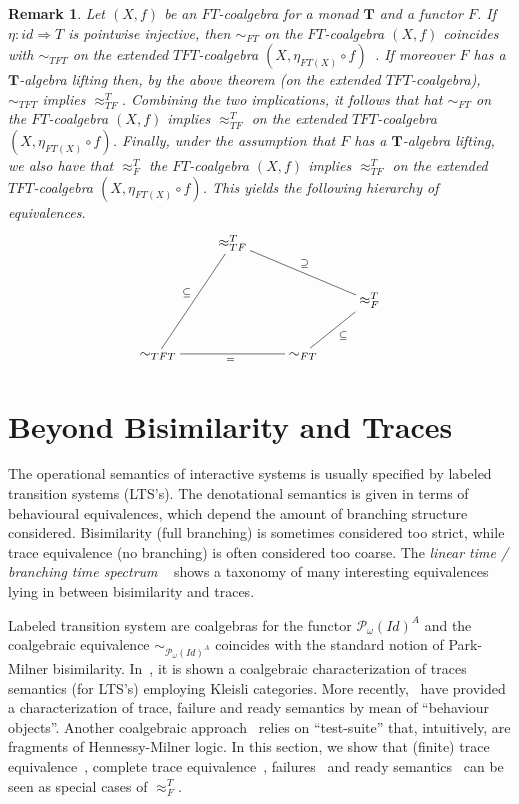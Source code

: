 \documentclass{LMCS}
\def\pow#1{{\mathcal P_\omega}#1}
\def\T{\mathbf{T}}
\newtheorem*{remark}{Remark}
\begin{document}
\begin{remark}
Let $(X,f)$ be an $FT$-coalgebra for a monad $\T$ and a functor $F$. If
$\eta\colon \mathit{id} \Rightarrow T$ is pointwise injective, then
$\sim_{FT}$ on the
$FT$-coalgebra $(X,f)$ coincides with $\sim_{TFT}$ on the extended
$TFT$-coalgebra
$(X, \eta_{FT(X)} \circ f)$~\cite{Rutten00,bartels}. If moreover $F$ has a
$\T$-algebra
lifting then, by the above theorem (on the extended $TFT$-coalgebra), $\sim_{TFT}$  implies
$\approx_{TF}^T$. Combining
the two implications, it follows that hat $\sim_{FT}$ on the
$FT$-coalgebra $(X,f)$ implies
$\approx_{TF}^T$ on the extended  $TFT$-coalgebra $(X, \eta_{FT(X)}
\circ f)$. Finally,
under the assumption that $F$ has a $\T$-algebra lifting, we also have
that $\approx_F^T$
the $FT$-coalgebra $(X,f)$ implies $\approx_{TF}^T$ on the extended
$TFT$-coalgebra
$(X, \eta_{FT(X)} \circ f)$. This yields the following hierarchy of equivalences.
\[
\xymatrix{
& \approx_{TF}^T\\
 & & & \approx_F^T\ar@{-}[ull]_\supseteq\\
\sim_{TFT}
\ar@{-}[uur]^{\subseteq} \ar@{-}[rr]_{=} & &
\sim_{FT}\ar@{-}[ur]_\subseteq
}
\]
\end{remark}



\section{Beyond Bisimilarity and Traces}\label{secbbat}
The operational semantics of interactive systems is
usually specified by labeled transition systems (LTS's). The denotational semantics is given in terms of behavioural
equivalences, which depend the amount of branching structure
considered. Bisimilarity (full branching) is sometimes considered
too strict, while trace equivalence (no
branching) is often considered too coarse. The \emph{linear time / branching time spectrum}
~\cite{Glabbeek90} shows a taxonomy of many interesting equivalences lying in between bisimilarity and traces.



Labeled transition system are coalgebras for the functor $\pow(Id)^A$ and the coalgebraic equivalence $\sim_{\pow(Id)^A}$ coincides
with the standard notion of Park-Milner bisimilarity. In~\cite{PowerTuri}, it is shown a coalgebraic
characterization of traces semantics (for LTS's) employing Kleisli categories. 
More recently,~\cite{Monteiro08} have provided a characterization of trace, failure and
ready semantics by mean of ``behaviour objects''. Another coalgebraic approach~\cite{Klin04} relies on ``test-suite'' that, intuitively, 
are fragments of Hennessy-Milner logic.
In this section, we show that (finite) trace equivalence~\cite{Hoare78}, complete trace equivalence~\cite{Glabbeek90},
failures~\cite{BrookesHR84} and ready semantics~\cite{OlderogH86}
can be seen as special cases of $\approx_F^T$.
\end{document}
